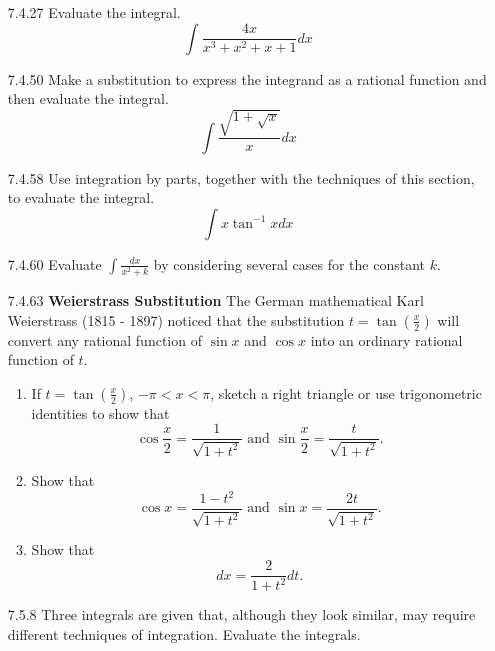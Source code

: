 \documentclass{article}
\begin{document}
\begin{enumerate}
\item[7.4.27]
    Evaluate the integral.
    \[
        \int \frac{4x}{x^{3} + x^{2} + x + 1}dx
    \]


\vspace{6cm}

\item[7.4.50]
    Make a substitution to express the integrand as a rational function and then
    evaluate the integral.
    \[
        \int \frac{\sqrt{1 + \sqrt{x}}}{x} dx
    \]

\vspace{6cm}

\item[7.4.58]
    Use integration by parts, together with the techniques of this section,
    to evaluate the integral.
    \[
        \int x \tan^{-1} x dx
    \]

\newpage

\item[7.4.60]
    Evaluate $\displaystyle \int \frac{dx}{x^{2} + k}$ by considering several
    cases for the constant $k$.

\vspace{8cm}

\item[7.4.63]
    \textbf{Weierstrass Substitution} The German mathematical Karl Weierstrass
    (1815 - 1897) noticed that the substitution $t=\tan (\frac{x}{2})$
    will convert any rational function of $\sin x$ and $\cos x$ into an
    ordinary rational function of $t$.

    \begin{enumerate}
        \item If $t=\tan (\frac{x}{2})$, $-\pi < x < \pi$, sketch a right
            triangle or use trigonometric identities to show that
            \[
                \cos \frac{x}{2} = \frac{1}{\sqrt{1+t^{2}}}
                \text{ and }
                \sin \frac{x}{2} = \frac{t}{\sqrt{1+t^{2}}}.
            \]
        \item Show that
            \[
                \cos x = \frac{1-t^{2}}{\sqrt{1+t^{2}}}
                \text{ and }
                \sin x = \frac{2t}{\sqrt{1+t^{2}}}.
            \]
        \item Show that
            \[
                dx = \frac{2}{1+t^{2}}dt.
            \]
    \end{enumerate}

\newpage

\item[7.5.8]
    Three integrals are given that, although they look similar, may
    require different techniques of integration. Evaluate the integrals.


\end{enumerate}
\end{document}
